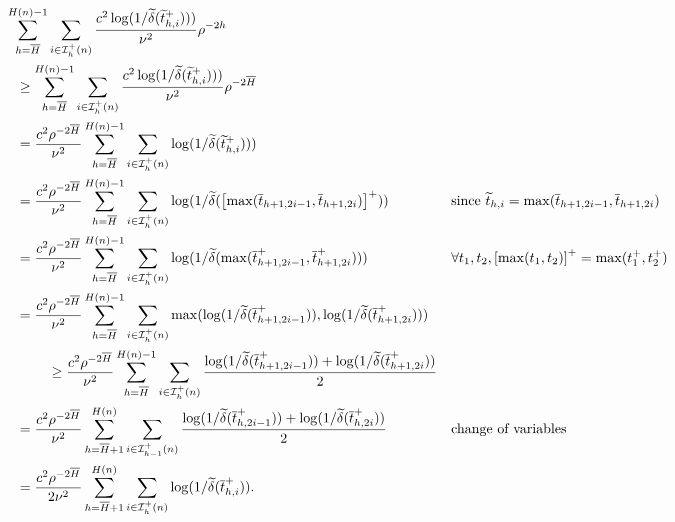       \begin{align*}
       \sum_{h=\bar{H}}^{H(n)-1}&\sum_{i\in\mathcal{I}_h^+(n)} \frac{c^2\operatorname{log}(1/\tilde{\delta}(\tilde{t}_{h,i}^+)))}{\nu^2}\rho^{-2h}  \\
       & \hspace{-0.8cm}  \geq \sum_{h=\bar{H}}^{H(n)-1}\sum_{i\in\mathcal{I}_h^+(n)} \frac{c^2\operatorname{log}(1/\tilde{\delta}(\tilde{t}_{h,i}^+)))}{\nu^2}\rho^{-2\bar{H}} \\
      & \hspace{-0.8cm}= \frac{c^2\rho^{-2\bar{H}}}{\nu^2} \sum_{h=\bar{H}}^{H(n)-1}\sum_{i\in\mathcal{I}_h^+(n)} \operatorname{log}(1/\tilde{\delta}(\tilde{t}_{h,i}^+))) \\
      & \hspace{-0.8cm}= \frac{c^2\rho^{-2\bar{H}}}{\nu^2} \sum_{h=\bar{H}}^{H(n)-1}\sum_{i\in\mathcal{I}_h^+(n)} \operatorname{log}(1/\tilde{\delta}(\left[\max(\bar{t}_{h+1,2i-1},\bar{t}_{h+1,2i})\right]^+)) && \text{since $\tilde{t}_{h,i}=\max(\bar{t}_{h+1,2i-1},\bar{t}_{h+1,2i})$} \\
      & \hspace{-0.8cm}= \frac{c^2\rho^{-2\bar{H}}}{\nu^2} \sum_{h=\bar{H}}^{H(n)-1}\sum_{i\in\mathcal{I}_h^+(n)} \operatorname{log}(1/\tilde{\delta}(\max(\bar{t}_{h+1,2i-1}^+,\bar{t}_{h+1,2i}^+))) && \text{$\forall t_1,t_2,\left[\max(t_1,t_2)\right]^+=\max(t_1^+,t_2^+)$} \\
      & \hspace{-0.8cm}= \frac{c^2\rho^{-2\bar{H}}}{\nu^2} \sum_{h=\bar{H}}^{H(n)-1}\sum_{i\in\mathcal{I}_h^+(n)} \max(\operatorname{log}(1/\tilde{\delta}(\bar{t}_{h+1,2i-1}^+)),\operatorname{log}(1/\tilde{\delta}(\bar{t}_{h+1,2i}^+))) \\
      & \geq \frac{c^2\rho^{-2\bar{H}}}{\nu^2} \sum_{h=\bar{H}}^{H(n)-1}\sum_{i\in\mathcal{I}_h^+(n)} \frac{\operatorname{log}(1/\tilde{\delta}(\bar{t}_{h+1,2i-1}^+))+\operatorname{log}(1/\tilde{\delta}(\bar{t}_{h+1,2i}^+))}{2} \\
      &\hspace{-0.8cm} = \frac{c^2\rho^{-2\bar{H}}}{\nu^2} \sum_{h=\bar{H}+1}^{H(n)}\sum_{i\in\mathcal{I}_{h-1}^+(n)} \frac{\operatorname{log}(1/\tilde{\delta}(\bar{t}_{h,2i-1}^+))+\operatorname{log}(1/\tilde{\delta}(\bar{t}_{h,2i}^+))}{2} && \text{change of variables} \\
      &\hspace{-0.8cm} = \frac{c^2\rho^{-2\bar{H}}}{2\nu^2} \sum_{h=\bar{H}+1}^{H(n)}\sum_{i\in\mathcal{I}_h^+(n)} \operatorname{log}(1/\tilde{\delta}(\bar{t}_{h,i}^+)).
\end{align*}
